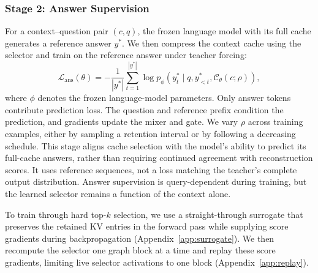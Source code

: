 \subsubsection{Stage 2: Answer Supervision}

For a context--question pair $(c,q)$, the frozen language model with its full cache generates a reference answer $y^*$. We then compress the context cache using the selector and train on the reference answer under teacher forcing:
\begin{equation}
    \mathcal{L}_{\mathrm{ans}}(\theta)=
    -\frac{1}{|y^*|}\sum_{t=1}^{|y^*|}
    \log p_{\phi}\!\left(y_t^*\mid q,y_{<t}^*,\mathcal{C}_{\theta}(c;\rho)\right),
    \label{eq:answerloss}
\end{equation}
where $\phi$ denotes the frozen language-model parameters. Only answer tokens contribute prediction loss. The question and reference prefix condition the prediction, and gradients update the mixer and gate. We vary $\rho$ across training examples, either by sampling a retention interval or by following a decreasing schedule. This stage aligns cache selection with the model's ability to predict its full-cache answers, rather than requiring continued agreement with reconstruction scores. It uses reference sequences, not a loss matching the teacher's complete output distribution. Answer supervision is query-dependent during training, but the learned selector remains a function of the context alone.

To train through hard top-$k$ selection, we use a straight-through surrogate that preserves the retained KV entries in the forward pass while supplying score gradients during backpropagation (Appendix~\ref{app:surrogate}). We then recompute the selector one graph block at a time and replay these score gradients, limiting live selector activations to one block (Appendix~\ref{app:replay}).
